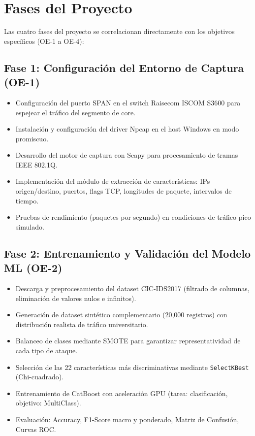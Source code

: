 \documentclass[12pt, letterpaper, oneside]{report}
\begin{document}
\section{Fases del Proyecto}

Las cuatro fases del proyecto se correlacionan directamente con los objetivos específicos (OE-1 a OE-4):

\subsection{Fase 1: Configuración del Entorno de Captura (OE-1)}
\begin{itemize}[leftmargin=*]
  \item Configuración del puerto SPAN en el switch Raisecom ISCOM S3600 para espejear el tráfico del segmento de core.
  \item Instalación y configuración del driver Npcap en el host Windows en modo promiscuo.
  \item Desarrollo del motor de captura con Scapy para procesamiento de tramas IEEE 802.1Q.
  \item Implementación del módulo de extracción de características: IPs origen/destino, puertos, flags TCP, longitudes de paquete, intervalos de tiempo.
  \item Pruebas de rendimiento (paquetes por segundo) en condiciones de tráfico pico simulado.
\end{itemize}

\subsection{Fase 2: Entrenamiento y Validación del Modelo ML (OE-2)}
\begin{itemize}[leftmargin=*]
  \item Descarga y preprocesamiento del dataset CIC-IDS2017 (filtrado de columnas, eliminación de valores nulos e infinitos).
  \item Generación de dataset sintético complementario (20,000 registros) con distribución realista de tráfico universitario.
  \item Balanceo de clases mediante SMOTE para garantizar representatividad de cada tipo de ataque.
  \item Selección de las 22 características más discriminativas mediante \texttt{SelectKBest} (Chi-cuadrado).
  \item Entrenamiento de CatBoost con aceleración GPU (tarea: clasificación, objetivo: MultiClass).
  \item Evaluación: Accuracy, F1-Score macro y ponderado, Matriz de Confusión, Curvas ROC.
\end{itemize}
\end{document}
